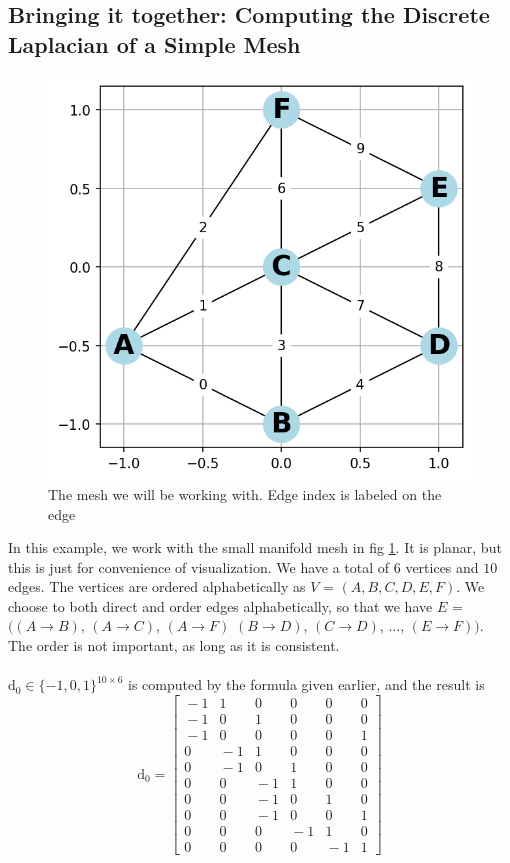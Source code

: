 \subsection*{Bringing it together: Computing the Discrete Laplacian of a Simple Mesh}
\begin{figure}[h]
    \centering
    \hspace*{-5mm}\includegraphics[width=0.9\columnwidth]{../images/dec_example_mesh.png}
    \caption{The mesh we will be working with. Edge index is labeled on the edge}
    \label{fig:dec_initial_mesh}
\end{figure}\noindent
In this example, we work with the small manifold mesh in fig \ref{fig:dec_initial_mesh}. It is planar, but this is just for convenience of visualization. We have a total of $6$ vertices and $10$ edges. The vertices are ordered alphabetically as $V$ = $(A, B, C, D, E, F)$. We choose to both direct and order edges alphabetically, so that we have $E$ = $\Big((A \to B)$, $(A \to C)$, $(A \to F)$ $(B \to D)$, $(C \to D)$, $\dots$, $(E \to F)\Big)$. The order is not important, as long as it is consistent.
\\
\\
$\text{d}_0  \in \{-1, 0, 1\}^{10 \times 6}$ is computed by the formula given earlier, and the result is
$$\text{d}_0 = \left[\begin{array}{rrrrrr}
    \!\!-1 &  1 &  0 &  0 &  0 &  0
    \\\!\!-1 &  0 &  1 &  0 &  0 &  0
    \\\!\!-1 &  0 &  0 &  0 &  0 &  1
    \\ 0 & \!\!-1 &  1 &  0 &  0 &  0
    \\ 0 & \!\!-1 &  0 &  1 &  0 &  0
    \\ 0 &  0 & \!\!-1 &  1 &  0 &  0
    \\ 0 &  0 & \!\!-1 &  0 &  1 &  0
    \\ 0 &  0 & \!\!-1 &  0 &  0 &  1
    \\ 0 &  0 &  0 & \!\!-1 &  1 &  0
    \\ 0 &  0 &  0 &  0 & \!\!-1 &  1
\end{array}\right]$$
